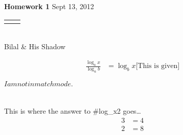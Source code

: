 \documentclass[12pt]{article}
\renewcommand{\title}[1]{\textbf{#1}}
\renewcommand{\line}{\begin{tabularx}{\textwidth}{X>{\raggedleft}X}\hline\\\end{tabularx}\\[-0.5cm]}
\begin{document}
\title{Homework 1}
\hfill Sept 13, 2012
\line
Bilal \& His Shadow


\begin{align}
	\frac{\log_{a}{x}}{\log_{a}{b}} &= \log_{b}{x}\mbox{[This is given]}
\end{align}

$I am not in match mode.$\\ \\ \\
This is where the answer to \#{log_{x}{2}}  goes\ldots
	\begin{align}
		3 &= 4 \\
		2 &= 8
	\end{align}
\end{document}
